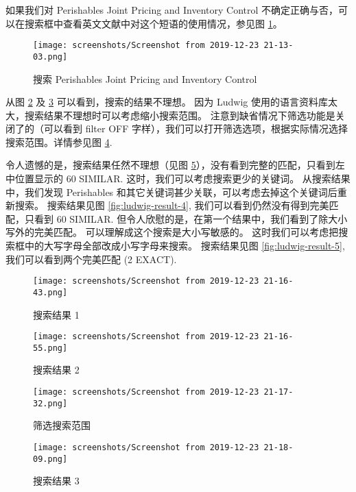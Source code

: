 \documentclass[cn,11pt, simple]{elegantbook}
\begin{document}
如果我们对 Perishables Joint Pricing and Inventory Control
不确定正确与否，可以在搜索框中查看英文文献中对这个短语的使用情况，参见图
\ref{fig:ludwig-search}。

\begin{figure}[!htbp]
  \centering
  \texttt{[image: screenshots/Screenshot from
  2019-12-23 21-13-03.png]}
  \caption{搜索 Perishables Joint Pricing and Inventory Control}
  \label{fig:ludwig-search}
\end{figure}

从图 \ref{fig:ludwig-result-1} 及 \ref{fig:ludwig-result-2}
可以看到，搜索的结果不理想。
因为 Ludwig 使用的语言资料库太大，搜索结果不理想时可以考虑缩小搜索范围。
注意到缺省情况下筛选功能是关闭了的（可以看到 filter OFF
字样），我们可以打开筛选选项，根据实际情况选择搜索范围。详情参见图
\ref{fig:ludwig-filter}.

令人遗憾的是，搜索结果任然不理想（见图
\ref{fig:ludwig-result-3}），没有看到完整的匹配，只看到左中位置显示的 60
SIMILAR.
这时，我们可以考虑搜索更少的关键词。
从搜索结果中，我们发现 Perishables
和其它关键词甚少关联，可以考虑去掉这个关键词后重新搜索。
搜索结果见图 \ref{fig:ludwig-result-4},
我们可以看到仍然没有得到完美匹配，只看到 60 SIMILAR.
但令人欣慰的是，在第一个结果中，我们看到了除大小写外的完美匹配。
可以理解成这个搜索是大小写敏感的。
这时我们可以考虑把搜索框中的大写字母全部改成小写字母来搜索。
搜索结果见图 \ref{fig:ludwig-result-5}, 我们可以看到两个完美匹配
(2 EXACT).

\begin{figure}[!htbp]
  \centering
  \texttt{[image: screenshots/Screenshot from
  2019-12-23 21-16-43.png]}
  \caption{搜索结果 1}
  \label{fig:ludwig-result-1}
\end{figure}

\begin{figure}[!htbp]
  \centering
  \texttt{[image: screenshots/Screenshot from
  2019-12-23 21-16-55.png]}
  \caption{搜索结果 2}
  \label{fig:ludwig-result-2}
\end{figure}

\begin{figure}[!htbp]
  \centering
  \texttt{[image: screenshots/Screenshot from
  2019-12-23 21-17-32.png]}
  \caption{筛选搜索范围}
  \label{fig:ludwig-filter}
\end{figure}

\begin{figure}[!htbp]
  \centering
  \texttt{[image: screenshots/Screenshot from
  2019-12-23 21-18-09.png]}
  \caption{搜索结果 3}
  \label{fig:ludwig-result-3}
\end{figure}
\end{document}
